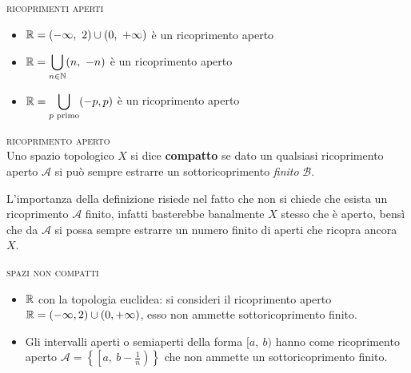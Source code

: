 \begin{examples} \textsc{ricoprimenti aperti}
	\begin{itemize}
		\item $\displaystyle \realset=(-\infty ,\ 2)\cup(0,\ +\infty)$ è un ricoprimento aperto
		\item $\displaystyle \mathbb{R} =\mathop{{\bigcup}}\displaylimits_{n\in\mathbb{N}}(n,\ -n)$ è un ricoprimento aperto
		\item $\displaystyle \mathbb{R}=\mathop{{\bigcup}}\displaylimits_{p \text{ primo}}(-p,p)$ è un ricoprimento aperto
	\end{itemize}
\end{examples}

\begin{define} \textsc{ricoprimento aperto}\\
	Uno spazio topologico $X$ si dice \textbf{compatto} se dato un qualsiasi ricoprimento aperto $\mathcal{A}$ si può sempre estrarre un sottoricoprimento \textit{finito} $\mathcal{B}$.
\end{define}
L'importanza della definizione risiede nel fatto che non si chiede che esista un ricoprimento $\mathcal{A}$ finito, infatti basterebbe banalmente $X$ stesso che è aperto, bensì che da $\mathcal{A}$ si possa sempre estrarre un numero finito di aperti che ricopra ancora $X$.

\begin{examples} \textsc{spazi non compatti}\\
	\begin{itemize}
		\item $\mathbb{R}$ con la topologia euclidea: si consideri il ricoprimento aperto $\displaystyle \mathbb{R}=(-\infty , 2)\cup(0,+\infty)$, esso non ammette sottoricoprimento finito.
		\item Gli intervalli aperti o semiaperti della forma $[a,\ b)$ hanno come ricoprimento aperto $\mathcal{A}=\left\{ \left[ a, \ b-\frac{1}{n}\right) \right\}$ che non ammette un sottoricoprimento finito.
	\end{itemize}
\end{examples}


